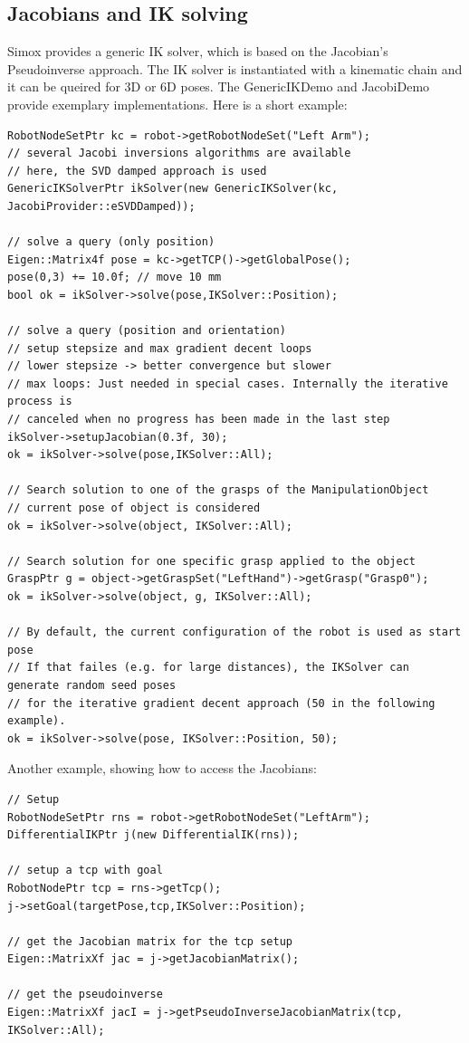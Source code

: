 \documentclass{book}
\begin{document}
\subsection{Jacobians and IK solving}
Simox provides a generic IK solver, which is based on the Jacobian's Pseudoinverse approach. The IK solver is instantiated with a kinematic chain and it can be queired for 3D or 6D poses. The GenericIKDemo and JacobiDemo provide exemplary implementations. Here is a short example:
\begin{lstlisting}
RobotNodeSetPtr kc = robot->getRobotNodeSet("Left Arm");
// several Jacobi inversions algorithms are available
// here, the SVD damped approach is used
GenericIKSolverPtr ikSolver(new GenericIKSolver(kc, JacobiProvider::eSVDDamped));

// solve a query (only position)
Eigen::Matrix4f pose = kc->getTCP()->getGlobalPose();
pose(0,3) += 10.0f; // move 10 mm
bool ok = ikSolver->solve(pose,IKSolver::Position);

// solve a query (position and orientation)
// setup stepsize and max gradient decent loops
// lower stepsize -> better convergence but slower
// max loops: Just needed in special cases. Internally the iterative process is
// canceled when no progress has been made in the last step
ikSolver->setupJacobian(0.3f, 30); 
ok = ikSolver->solve(pose,IKSolver::All);

// Search solution to one of the grasps of the ManipulationObject
// current pose of object is considered
ok = ikSolver->solve(object, IKSolver::All);

// Search solution for one specific grasp applied to the object
GraspPtr g = object->getGraspSet("LeftHand")->getGrasp("Grasp0");
ok = ikSolver->solve(object, g, IKSolver::All);

// By default, the current configuration of the robot is used as start pose
// If that failes (e.g. for large distances), the IKSolver can generate random seed poses
// for the iterative gradient decent approach (50 in the following example).
ok = ikSolver->solve(pose, IKSolver::Position, 50);
\end{lstlisting}
Another example, showing how to access the Jacobians:
\begin{lstlisting}
// Setup
RobotNodeSetPtr rns = robot->getRobotNodeSet("LeftArm");
DifferentialIKPtr j(new DifferentialIK(rns));

// setup a tcp with goal
RobotNodePtr tcp = rns->getTcp();
j->setGoal(targetPose,tcp,IKSolver::Position);

// get the Jacobian matrix for the tcp setup
Eigen::MatrixXf jac = j->getJacobianMatrix();

// get the pseudoinverse
Eigen::MatrixXf jacI = j->getPseudoInverseJacobianMatrix(tcp, IKSolver::All);
\end{lstlisting}
\end{document}
